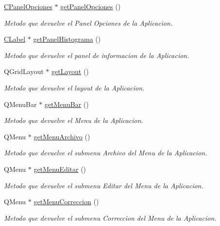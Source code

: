 \begin{DoxyCompactItemize}
\hyperlink{classCPanelOpciones}{C\+Panel\+Opciones} $\ast$ \hyperlink{classCAplicacion_a105f731579e2c93cdd5826fee8a90660}{get\+Panel\+Opciones} ()
\begin{DoxyCompactList}\small\item\em Metodo que devuelve el Panel Opciones de la Aplicacion. \end{DoxyCompactList}\item 
\hyperlink{classCLabel}{C\+Label} $\ast$ \hyperlink{classCAplicacion_a9cb501579c4725ffcc2708c824dca71c}{get\+Panel\+Histograma} ()
\begin{DoxyCompactList}\small\item\em Metodo que devuelve el panel de informacion de la Aplicacion. \end{DoxyCompactList}\item 
Q\+Grid\+Layout $\ast$ \hyperlink{classCAplicacion_af8687ea0c860ca7df1f0189f932ea93d}{get\+Layout} ()
\begin{DoxyCompactList}\small\item\em Metodo que devuelve el layout de la Aplicacion. \end{DoxyCompactList}\item 
Q\+Menu\+Bar $\ast$ \hyperlink{classCAplicacion_a8b8ddfe3c7112cd0645926fe3c628c7f}{get\+Menu\+Bar} ()
\begin{DoxyCompactList}\small\item\em Metodo que devuelve el Menu de la Aplicacion. \end{DoxyCompactList}\item 
Q\+Menu $\ast$ \hyperlink{classCAplicacion_a9eb944127e33a2f045b59875c1920756}{get\+Menu\+Archivo} ()
\begin{DoxyCompactList}\small\item\em Metodo que devuelve el submenu Archivo del Menu de la Aplicacion. \end{DoxyCompactList}\item 
Q\+Menu $\ast$ \hyperlink{classCAplicacion_a283d64e238855df344498c8aed50ff96}{get\+Menu\+Editar} ()
\begin{DoxyCompactList}\small\item\em Metodo que devuelve el submenu Editar del Menu de la Aplicacion. \end{DoxyCompactList}\item 
Q\+Menu $\ast$ \hyperlink{classCAplicacion_a67443b72909b19dfae9f2d322b2eaa7e}{get\+Menu\+Correccion} ()
\begin{DoxyCompactList}\small\item\em Metodo que devuelve el submenu Correccion del Menu de la Aplicacion. \end{DoxyCompactList}\item 

\end{DoxyCompactItemize}
